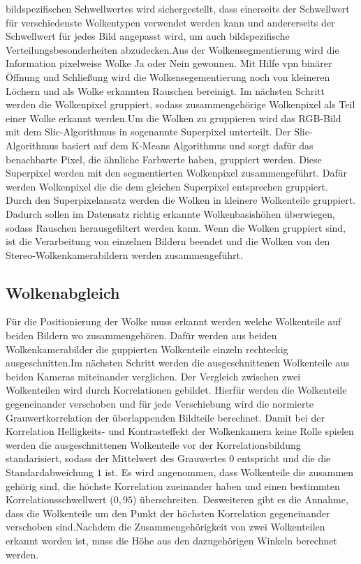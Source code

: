\documentclass[a4paper,11pt,twoside,german]{article}
\newcommand{\absatz}{\smallbreak}
\begin{document}
bildspezifischen Schwellwertes wird sichergestellt, dass einerseits der
Schwellwert für verschiedenste Wolkentypen verwendet werden kann und
andererseits der Schwellwert für jedes Bild angepasst wird, um auch
bildspezifische Verteilungsbesonderheiten abzudecken.\absatz Aus der
Wolkensegmentierung wird die Information pixelweise Wolke Ja oder Nein gewonnen.
Mit Hilfe vpn binärer Öffnung und Schließung wird die Wolkensegementierung noch
von kleineren Löchern und als Wolke erkannten Rauschen bereinigt. Im nächsten
Schritt werden die Wolkenpixel gruppiert, sodass zusammengehörige Wolkenpixel
als Teil einer Wolke erkannt werden.\absatz Um die Wolken zu gruppieren wird das
RGB-Bild mit dem Slic-Algorithmus in sogenannte Superpixel unterteilt. Der
Slic-Algorithmus basiert auf dem K-Means Algorithmus und sorgt dafür das
benachbarte Pixel, die ähnliche Farbwerte haben, gruppiert werden. Diese
Superpixel werden mit den segmentierten Wolkenpixel zusammengeführt. Dafür
werden Wolkenpixel die die dem gleichen Superpixel entsprechen gruppiert. Durch
den Superpixelansatz werden die Wolken in kleinere Wolkenteile gruppiert.
Dadurch sollen im Datensatz richtig erkannte Wolkenbasishöhen überwiegen, sodass
Rauschen herausgefiltert werden kann.
\absatz
Wenn die Wolken gruppiert sind, ist die Verarbeitung von einzelnen Bildern
beendet und die Wolken von den Stereo-Wolkenkamerabildern werden
zusammengeführt.

\subsection{Wolkenabgleich}
Für die Positionierung der Wolke muss erkannt werden
welche Wolkenteile auf beiden Bildern wo zusammengehören. Dafür werden aus
beiden Wolkenkamerabilder die guppierten Wolkenteile einzeln rechteckig
ausgeschnitten.\absatz Im nächsten Schritt werden die ausgeschnittenen Wolkenteile
aus beiden Kameras miteinander verglichen. Der Vergleich zwischen zwei
Wolkenteilen wird durch Korrelationen gebildet. Hierfür werden die Wolkenteile
gegeneinander verschoben und für jede Verschiebung wird die normierte
Grauwertkorrelation der überlappenden Bildteile berechnet. Damit bei der
Korrelation Helligkeits- und Kontrasteffekt der Wolkenkamera keine Rolle spielen
werden die ausgeschnittenen Wolkenteile vor der Korrelationsbildung
standarisiert, sodass der Mittelwert des Grauwertes $0$ entspricht und die die
Standardabweichung $1$ ist. Es wird angenommen, dass Wolkenteile die zusammen
gehörig sind, die höchste Korrelation zueinander haben und einen bestimmten
Korrelationsschwellwert ($0,95$) überschreiten. Desweiteren gibt es die Annahme,
dass die Wolkenteile um den Punkt der höchsten Korrelation gegeneinander
verschoben sind.\absatz Nachdem die Zusammengehörigkeit von zwei Wolkenteilen erkannt
worden ist, muss die Höhe aus den dazugehörigen Winkeln berechnet werden.
\end{document}
